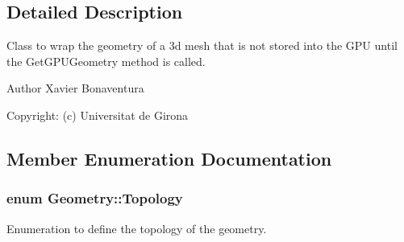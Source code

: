 \subsection{Detailed Description}
Class to wrap the geometry of a 3d mesh that is not stored into the G\+P\+U until the Get\+G\+P\+U\+Geometry method is called. 

\begin{DoxyAuthor}{Author}
Xavier Bonaventura 

Copyright\+: (c) Universitat de Girona 
\end{DoxyAuthor}


\subsection{Member Enumeration Documentation}
\hypertarget{class_geometry_af0136a3b268286ee5921cc6af5239293}{
\subsubsection[{Topology}]{\setlength{\rightskip}{0pt plus 5cm}enum {\bf Geometry\+::\+Topology}}}\label{class_geometry_af0136a3b268286ee5921cc6af5239293}


Enumeration to define the topology of the geometry. 

